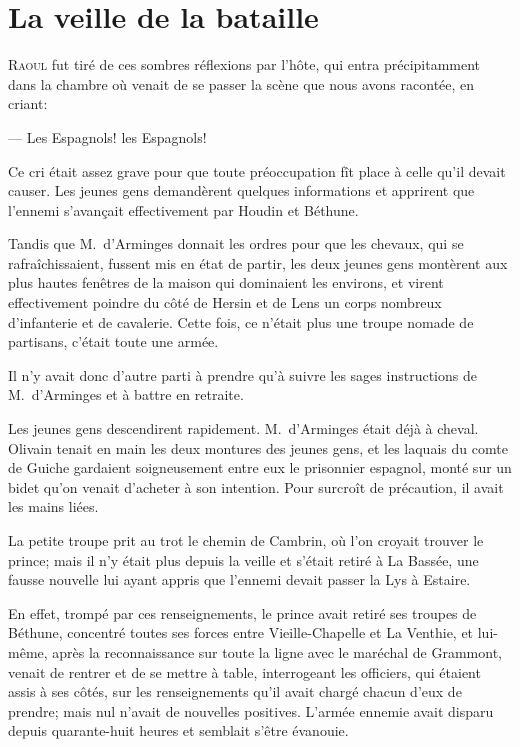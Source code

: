 \chapter{La veille de la bataille}

\lettrine{R}{aoul} fut tiré de ces sombres réflexions par l'hôte, qui entra précipitamment dans la chambre où venait de se passer la scène que nous avons racontée, en criant:

\zz
— Les Espagnols! les Espagnols!

\zz
Ce cri était assez grave pour que toute préoccupation fît place à celle qu'il devait causer. Les jeunes gens demandèrent quelques informations et apprirent que l'ennemi s'avançait effectivement par Houdin et Béthune.

Tandis que M.~d'Arminges donnait les ordres pour que les chevaux, qui se rafraîchissaient, fussent mis en état de partir, les deux jeunes gens montèrent aux plus hautes fenêtres de la maison qui dominaient les environs, et virent effectivement poindre du côté de Hersin et de Lens un corps nombreux d'infanterie et de cavalerie. Cette fois, ce n'était plus une troupe nomade de partisans, c'était toute une armée.

Il n'y avait donc d'autre parti à prendre qu'à suivre les sages instructions de M.~d'Arminges et à battre en retraite.

Les jeunes gens descendirent rapidement. M.~d'Arminges était déjà à cheval. Olivain tenait en main les deux montures des jeunes gens, et les laquais du comte de Guiche gardaient soigneusement entre eux le prisonnier espagnol, monté sur un bidet qu'on venait d'acheter à son intention. Pour surcroît de précaution, il avait les mains liées.

La petite troupe prit au trot le chemin de Cambrin, où l'on croyait trouver le prince; mais il n'y était plus depuis la veille et s'était retiré à La Bassée, une fausse nouvelle lui ayant appris que l'ennemi devait passer la Lys à Estaire.

En effet, trompé par ces renseignements, le prince avait retiré ses troupes de Béthune, concentré toutes ses forces entre Vieille-Chapelle et La Venthie, et lui-même, après la reconnaissance sur toute la ligne avec le maréchal de Grammont, venait de rentrer et de se mettre à table, interrogeant les officiers, qui étaient assis à ses côtés, sur les renseignements qu'il avait chargé chacun d'eux de prendre; mais nul n'avait de nouvelles positives. L'armée ennemie avait disparu depuis quarante-huit heures et semblait s'être évanouie.

